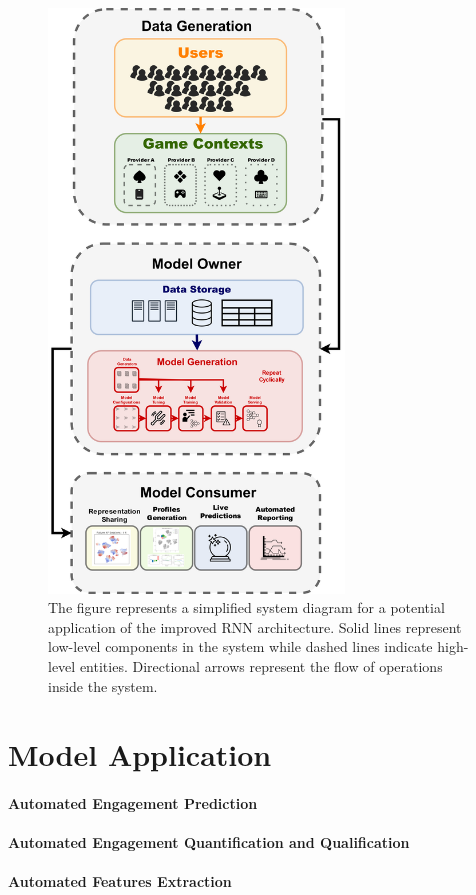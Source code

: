 \begin{figure}[ht]
\centering
\includegraphics[width=0.7\textwidth]{images/chapter_5/pipeline_diagram.png}
\caption[\textbf{Model Deployment Pipeline}]{The figure represents a simplified system diagram for a potential application of the improved RNN architecture. Solid lines represent low-level components in the system while dashed lines indicate high-level entities. Directional arrows represent the flow of operations inside the system.}
\label{pipeline}
\end{figure}


\section{Model Application}
\label{industry_needs}

\paragraph*{Automated Engagement Prediction}
\lorem

\paragraph*{Automated Engagement Quantification and Qualification}
\lorem

\paragraph*{Automated Features Extraction}
\lorem